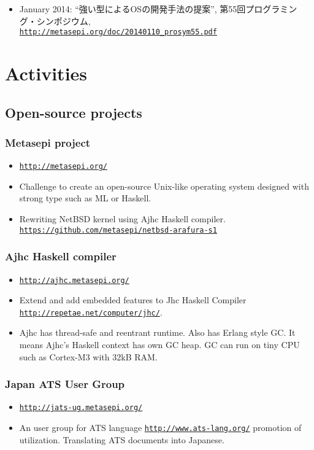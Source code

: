 \documentclass[letterpaper]{article}
\begin{document}
\begin{itemize}
  \item January 2014: ``強い型によるOSの開発手法の提案'', 第55回プログラミング・シンポジウム, \\
    \href{http://metasepi.org/doc/20140110\_prosym55.pdf}{\tt http://metasepi.org/doc/20140110\_prosym55.pdf}
\end{itemize}

\section*{Activities}

\subsection*{Open-source projects}

\subsubsection*{Metasepi project}
\begin{itemize}
\item \href{http://metasepi.org/}{\tt http://metasepi.org/}
\item Challenge to create an open-source Unix-like operating system designed with strong type such as ML or Haskell.
\item Rewriting NetBSD kernel using Ajhc Haskell compiler. \href{https://github.com/metasepi/netbsd-arafura-s1}{\tt https://github.com/metasepi/netbsd-arafura-s1}
\end{itemize}

\subsubsection*{Ajhc Haskell compiler}
\begin{itemize}
\item \href{http://ajhc.metasepi.org/}{\tt http://ajhc.metasepi.org/}
\item Extend and add embedded features to Jhc Haskell Compiler \href{http://repetae.net/computer/jhc/}{\tt http://repetae.net/computer/jhc/}.
\item Ajhc has thread-safe and reentrant runtime. Also has Erlang style GC. It means Ajhc's Haskell context has own GC heap. GC can run on tiny CPU such as Cortex-M3 with 32kB RAM.
\end{itemize}

\subsubsection*{Japan ATS User Group}
\begin{itemize}
\item \href{http://jats-ug.metasepi.org/}{\tt http://jats-ug.metasepi.org/}
\item An user group for ATS language \href{http://www.ats-lang.org/}{\tt http://www.ats-lang.org/} promotion of utilization. Translating ATS documents into Japanese.
\end{itemize}
\end{document}
